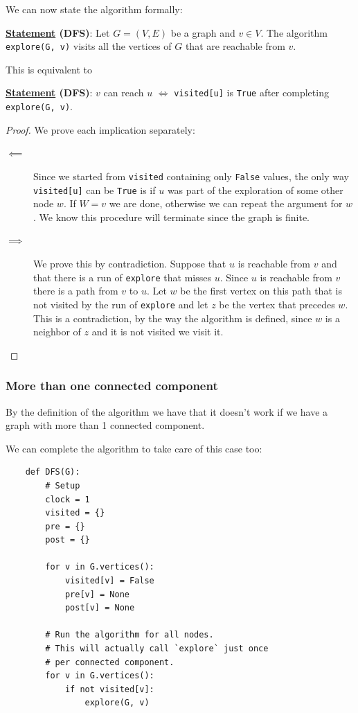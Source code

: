 \documentclass[12pt]{extarticle}
\begin{document}
We can now state the algorithm formally:

\textbf{\underline{Statement} (DFS)}: Let $G = (V, E)$ be a graph and $v \in V$.
The algorithm \texttt{explore(G, v)} visits all the vertices of $G$ that are reachable from $v$.

This is equivalent to

\textbf{\underline{Statement} (DFS)}: $v$ can reach $u$ $\iff$ \texttt{visited[u]} is \texttt{True} after completing \texttt{explore(G, v)}.

\begin{proof}
    We prove each implication separately:

    \begin{description}
        \item[$\impliedby$] Since we started from \texttt{visited} containing only \texttt{False} values,
            the only way \texttt{visited[u]} can be \texttt{True} is if $u$ was part of the exploration of some other node $w$.
            If $W = v$ we are done, otherwise we can repeat the argument for $w$.
            We know this procedure will terminate since the graph is finite.
        \item[$\implies$] We prove this by contradiction.
            Suppose that $u$ is reachable from $v$ and that there is a run of \texttt{explore} that misses $u$.
            Since $u$ is reachable from $v$ there is a path from $v$ to $u$.
            Let $w$ be the first vertex on this path that is not visited by the run of \texttt{explore} and let $z$ be the vertex that precedes $w$.
            This is a contradiction, by the way the algorithm is defined, since $w$ is a neighbor of $z$ and it is not visited we visit it.
    \end{description}
\end{proof}

\subsubsection{More than one connected component}

By the definition of the algorithm we have that it doesn't work if we have a graph with more than 1 connected component.

We can complete the algorithm to take care of this case too:

\begin{verbatim}
    def DFS(G):
        # Setup
        clock = 1
        visited = {}
        pre = {}
        post = {}

        for v in G.vertices():
            visited[v] = False
            pre[v] = None
            post[v] = None

        # Run the algorithm for all nodes.
        # This will actually call `explore` just once
        # per connected component.
        for v in G.vertices():
            if not visited[v]:
                explore(G, v)

\end{verbatim}
\end{document}
